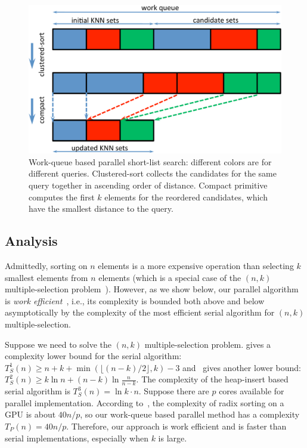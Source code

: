 \begin{figure}[htb]
  \centering
  \includegraphics[width=0.8\linewidth]{figs/6/workqueue.pdf}
  \caption[Work-queue based parallel short-list search]{\label{fig:6:workqueue} Work-queue based parallel short-list search: different colors are for different queries. Clustered-sort collects the candidates for the same query together in ascending order of distance. Compact primitive computes the first $k$ elements for the reordered candidates, which have the smallest distance to the query. }
\end{figure}

\subsection{Analysis}

Admittedly, sorting on $n$ elements is a more expensive operation than selecting $k$ smallest elements from $n$ elements (which is a special case of the $(n,k)$ multiple-selection problem~\cite{Knuth:1998:ACP}). However, as we show below, our parallel algorithm is \emph{work efficient}~\cite{Joesphbook}, i.e., its complexity is bounded both above and below asymptotically by the complexity of the most efficient serial algorithm for $(n,k)$ multiple-selection.

Suppose we need to solve the $(n,k)$ multiple-selection problem. \cite{Knuth:1998:ACP} gives a complexity lower bound for the serial algorithm: $T_S^1(n) \geq n + k + \min(\lfloor (n-k)/2\rfloor, k) -3$
and~\cite{Kaligosi:2005} gives another lower bound: $T_S^2(n) \geq k \ln n + (n-k)\ln\frac{n}{n-k}$.
The complexity of the heap-insert based serial algorithm is $T_S^3(n) = \ln k \cdot n$.
Suppose there are $p$ cores available for parallel implementation. According to~\cite{Merrill:2010:RSG}, the complexity of radix sorting on a GPU is about $40 n / p$, so our work-queue based parallel method has a complexity $T_P(n) = 40 n / p$.
Therefore, our approach is work efficient and is faster than serial implementations, especially when $k$ is large.

